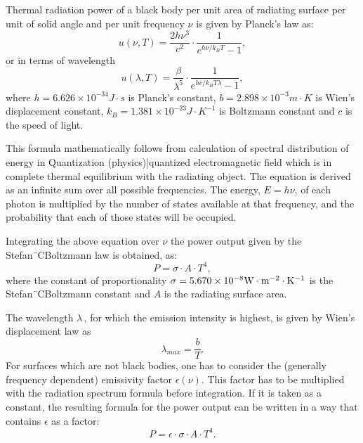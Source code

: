 Thermal radiation power of a black body per unit area of radiating surface per unit of solid angle and per unit frequency $\nu$ is given by Planck's law as:
\begin{equation}
u(\nu,T)=\frac{2 h\nu^3}{c^2}\cdot\frac1{e^{h\nu/k_BT}-1},
\end{equation}
or in terms of wavelength
\begin{equation}
u(\lambda,T)=\frac{\beta}{\lambda^5}\cdot\frac1{e^{hc/k_BT\lambda}-1},
\end{equation}
where $h=6.626\times10^{-34}J \cdot s$ is Planck's constant, $b=2.898\times10^{-3}m \cdot K$ is Wien's displacement constant, $k_{B}=1.381\times10^{-23}J \cdot K^{-1}$ is Boltzmann constant and $c$ is the speed of light.

This formula mathematically follows from calculation of spectral distribution of energy in Quantization (physics)|quantized electromagnetic field which is in complete thermal equilibrium with the radiating object. The equation is derived as an infinite sum over all possible frequencies. The energy, $E=h \nu$, of each photon is multiplied by the number of states available at that frequency, and the probability that each of those states will be occupied.

Integrating the above equation over $\nu$ the power output given by the Stefan¨CBoltzmann law is obtained, as:
\begin{equation}
P = \sigma \cdot A \cdot T^4,
\label{Equ:IntegratingOfStefanBoltzmann}
\end{equation}
where the constant of proportionality $\sigma=5.670\times10^{-8}\rm{W}\cdot \rm{m}^{-2}\cdot \rm{K}^{-1}$ is the Stefan¨CBoltzmann constant and $A$ is the radiating surface area.

The wavelength $\lambda \,$, for which the emission intensity is highest, is given by Wien's displacement law as
\begin{equation}
\lambda_{max} = \frac{b}{T}.
\end{equation}
For surfaces which are not black bodies, one has to consider the (generally frequency dependent) emissivity factor $\epsilon(\nu)$. This factor has to be multiplied with the radiation spectrum formula before integration. If it is taken as a constant, the resulting formula for the power output can be written in a way that contains $\epsilon$ as a factor:
\begin{equation}
P = \epsilon \cdot \sigma \cdot A \cdot T^4.
\end{equation}


